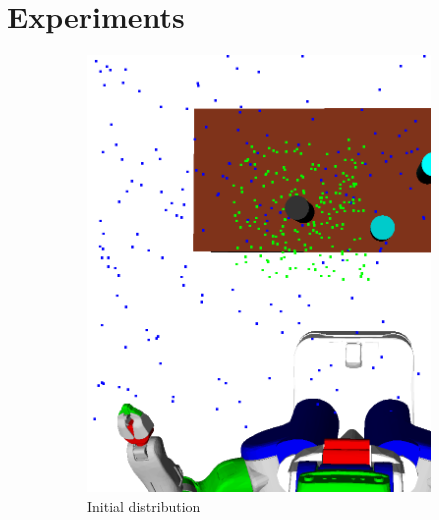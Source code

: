\section{Experiments}
\begin{figure}
  \centering
  \begin{subfigure}[b]{0.48\linewidth}
    \includegraphics[width=\textwidth]{images/learns.png}
    \caption{Initial distribution}
  \end{subfigure}
  \begin{subfigure}[b]{0.48\linewidth}

\end{subfigure}
\end{figure}
